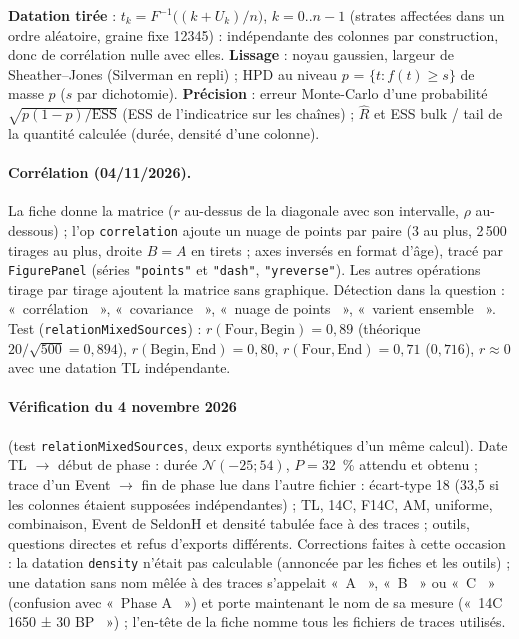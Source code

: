 \documentclass[11pt,a4paper]{article}
\providecommand{\og}{«~}\providecommand{\fg}{\unskip~»}
\newcommand{\code}[1]{\texttt{\small #1}}
\begin{document}
\textbf{Datation tirée} : $t_k=F^{-1}\big((k+U_k)/n\big)$, $k=0..n-1$ (strates affectées dans un ordre aléatoire, graine
fixe 12345) : indépendante des colonnes par construction, donc de corrélation nulle avec elles. \textbf{Lissage} :
noyau gaussien, largeur de Sheather--Jones (Silverman en repli) ; HPD au niveau $p$ = $\{t : f(t)\ge s\}$ de masse $p$
($s$ par dichotomie). \textbf{Précision} : erreur Monte-Carlo d'une probabilité $\sqrt{p(1-p)/\text{ESS}}$ (ESS de
l'indicatrice sur les chaînes) ; $\hat R$ et ESS bulk / tail de la quantité calculée (durée, densité d'une colonne).

\paragraph{Corrélation (04/11/2026).} La fiche donne la matrice ($r$ au-dessus de la diagonale avec son intervalle,
$\rho$ au-dessous) ; l'op \code{correlation} ajoute un nuage de points par paire (3 au plus, 2\,500 tirages au plus,
droite $B=A$ en tirets ; axes inversés en format d'âge), tracé par \code{FigurePanel} (séries \code{"points"} et
\code{"dash"}, \code{"yreverse"}). Les autres opérations tirage par tirage ajoutent la matrice sans graphique. Détection
dans la question : \og corrélation \fg, \og covariance \fg, \og nuage de points \fg, \og varient ensemble \fg. Test
(\code{relationMixedSources}) : $r(\text{Four}, \text{Begin}) = 0{,}89$ (théorique $20/\sqrt{500}=0{,}894$),
$r(\text{Begin}, \text{End}) = 0{,}80$, $r(\text{Four}, \text{End}) = 0{,}71$ ($0{,}716$), $r \approx 0$ avec une
datation TL indépendante.

\paragraph{Vérification du 4 novembre 2026} (test \code{relationMixedSources}, deux exports synthétiques d'un même
calcul). Date TL $\rightarrow$ début de phase : durée $\mathcal N(-25 ; 54)$, $P = 32$~\% attendu et obtenu ; trace
d'un Event $\rightarrow$ fin de phase lue dans l'autre fichier : écart-type 18 (33,5 si les colonnes étaient
supposées indépendantes) ; TL, 14C, F14C, AM, uniforme, combinaison, Event de SeldonH et densité tabulée face à des
traces ; outils, questions directes et refus d'exports différents. Corrections faites à cette occasion : la datation
\code{density} n'était pas calculable (annoncée par les fiches et les outils) ; une datation sans nom mêlée à des
traces s'appelait \og A \fg, \og B \fg{} ou \og C \fg{} (confusion avec \og Phase A \fg) et porte maintenant le nom de
sa mesure (\og 14C 1650 ± 30 BP \fg) ; l'en-tête de la fiche nomme tous les fichiers de traces utilisés.
\end{document}
